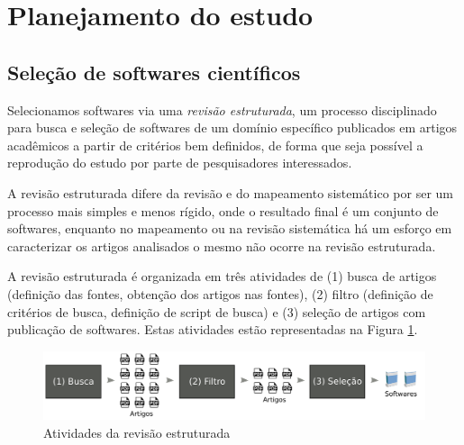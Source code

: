 \section{Planejamento do estudo}

\subsection{Seleção de softwares científicos}

Selecionamos softwares via uma {\it
revisão estruturada}, um processo disciplinado para busca e seleção de
softwares de um domínio específico publicados em artigos acadêmicos a partir de
critérios bem definidos, de forma que seja possível a reprodução do estudo por
parte de pesquisadores interessados.

A revisão estruturada difere da revisão \cite{Kitchenham2007} e do mapeamento sistemático por ser um
processo mais simples e menos rígido, onde o resultado final é um conjunto de
softwares, enquanto no mapeamento ou na revisão sistemática há um esforço em
caracterizar os artigos analisados o mesmo não ocorre na revisão estruturada.

A revisão estruturada é organizada em três atividades de (1) busca de artigos
(definição das fontes, obtenção dos artigos nas fontes), (2) filtro (definição
de critérios de busca, definição de script de busca) e (3) seleção de artigos
com publicação de softwares. Estas atividades estão representadas na Figura
\ref{figura-revisao-estruturada}.

\begin{figure}[h]
  \center
  \includegraphics[scale=0.21]{imagens/revisao-estruturada.png}
  \caption{Atividades da revisão estruturada}
  \label{figura-revisao-estruturada}
\end{figure}

